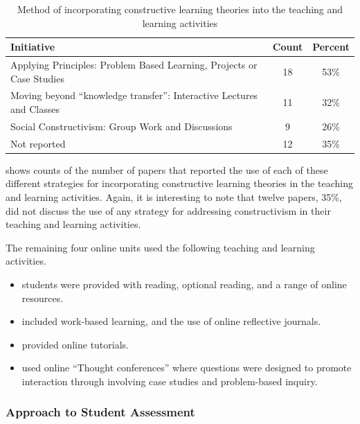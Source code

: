 \begin{table}[htpb]
	\centering
	\caption{Method of incorporating constructive learning theories into the teaching and learning activities}
	\label{tbl:class_constructive}
	\footnotesize
    \begin{tabular}{l|c|c}
    \textbf{Initiative} & \textbf{Count} & \textbf{Percent} \\ \hline
    Applying Principles: Problem Based Learning, Projects or Case Studies & 18 & 53\% \\
    Moving beyond ``knowledge transfer'': Interactive Lectures and Classes & 11 & 32\% \\
    Social Constructivism: Group Work and Discussions & 9 & 26\% \\
    Not reported & 12 & 35\% \\
    \end{tabular}
\end{table}

 shows counts of the number of papers that reported the use of each of these different strategies for incorporating constructive learning theories in the teaching and learning activities. Again, it is interesting to note that twelve papers, 35\%, did not discuss the use of any strategy for addressing constructivism in their teaching and learning activities.

The remaining four online units used the following teaching and learning activities.

\begin{itemize}[noitemsep,nolistsep]
	\item \citet{hoddinott2000biggs} students were provided with reading, optional reading, and a range of online resources.
	\item \citet{raeburn2009blended} included work-based learning, and the use of online reflective journals.
	\item \citet{terrell2011using} provided online tutorials.
	\item \citet{brown2006looking} used online ``Thought conferences'' where questions were designed to promote interaction through involving case studies and problem-based inquiry.
\end{itemize}

\subsubsection{Approach to Student Assessment} %
\label{sub:review_assessment_approach}

